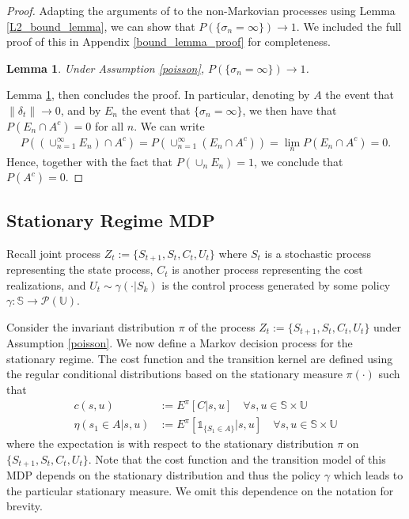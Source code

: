 \documentclass[11pt]{article}
\newtheorem{lemma}{Lemma}
\def\P{{\mathcal P}}
\begin{document}
\begin{proof}
Adapting the arguments of  \cite[Theorem 17]{benveniste2012adaptive} to the non-Markovian processes using Lemma \ref{L2_bound_lemma}, we can show that $P(\{\sigma_n=\infty\})\to 1$. We included the full proof of this in  Appendix \ref{bound_lemma_proof} for completeness.  
\begin{lemma}\label{bound_lemma}
Under Assumption \ref{poisson}, $P(\{\sigma_n=\infty\})\to 1$.
\end{lemma}
Lemma \ref{bound_lemma}, then concludes the proof. In particular, denoting by $A$ the event that $\|\delta_t\|\to 0$, and by $E_n$ the event that $\{\sigma_n=\infty\}$, we then have that $P(E_n \cap A^c)=0$ for all $n$. We can write
\begin{align*}
P((\cup_{n=1}^\infty E_n)\cap A^c)= P(\cup_{n=1}^\infty (E_n\cap A^c)) = \lim_n P(E_n \cap A^c)=0. 
\end{align*} 
Hence, together with the fact that $P(\cup_n E_n)=1$, we conclude that $P(A^c)=0$.



\end{proof}

\subsection{Stationary Regime MDP}\label{stat_MDP}


Recall joint process $Z_t:=\{S_{t+1},S_t,C_t,U_t\}$ where $S_t$ is a stochastic process representing the state process, $C_t$ is another process representing the cost realizations, and $U_t\sim\gamma(\cdot|S_k)$ is the control process generated by some policy $\gamma:\mathds{S}\to\P(\mathds{U})$. 


Consider the invariant distribution $\pi$ of the process  $Z_t:=\{S_{t+1},S_t,C_t,U_t\}$ under Assumption \ref{poisson}.  We now define a Markov decision process for the stationary regime. 
The cost function and the transition kernel  are defined using the regular conditional distributions based on the stationary measure $\pi(\cdot)$ such that
\begin{align}\label{stat_model}
c(s,u)&:=E^\pi[C|s,u] \quad \forall s,u\in\mathds{S}\times\mathds{U}\nonumber\\
\eta(s_1\in A|s,u)& := E^\pi\left[\mathds{1}_{\{S_1\in A\}}|s,u\right]  \quad \forall s,u\in\mathds{S}\times\mathds{U}
\end{align}
where the expectation is with respect to the stationary distribution $\pi$ on $\{S_{t+1},S_t,C_t,U_t\}$. Note that the cost function and the transition model of this MDP depends on the stationary distribution and thus the policy $\gamma$ which leads to the particular stationary measure. We omit this dependence on the notation for brevity.
\end{document}
